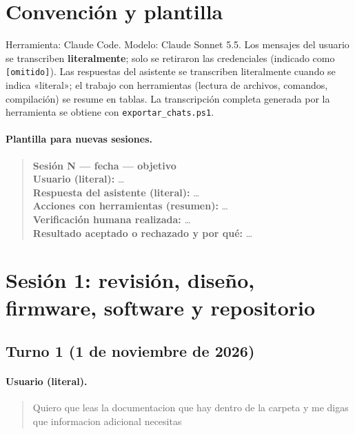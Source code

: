 \documentclass[12pt,a4paper]{article}
\begin{document}

\tableofcontents
\newpage

\section{Convención y plantilla}

Herramienta: Claude Code. Modelo: Claude Sonnet 5.5. Los mensajes del usuario se transcriben \textbf{literalmente}; solo se retiraron las credenciales (indicado como \texttt{[omitido]}). Las respuestas del asistente se transcriben literalmente cuando se indica «literal»; el trabajo con herramientas (lectura de archivos, comandos, compilación) se resume en tablas. La transcripción completa generada por la herramienta se obtiene con \texttt{exportar\_chats.ps1}.

\paragraph{Plantilla para nuevas sesiones.}

\begin{quote}\small
\textbf{Sesión N --- fecha --- objetivo}\\
\textbf{Usuario (literal):} \ldots\\
\textbf{Respuesta del asistente (literal):} \ldots\\
\textbf{Acciones con herramientas (resumen):} \ldots\\
\textbf{Verificación humana realizada:} \ldots\\
\textbf{Resultado aceptado o rechazado y por qué:} \ldots
\end{quote}

\section{Sesión 1: revisión, diseño, firmware, software y repositorio}

\subsection{Turno 1 (1 de noviembre de 2026)}

\paragraph{Usuario (literal).}
\begin{quote}
Quiero que leas la documentacion que hay dentro de la carpeta y me digas que informacion adicional necesitas
\end{quote}
\end{document}
